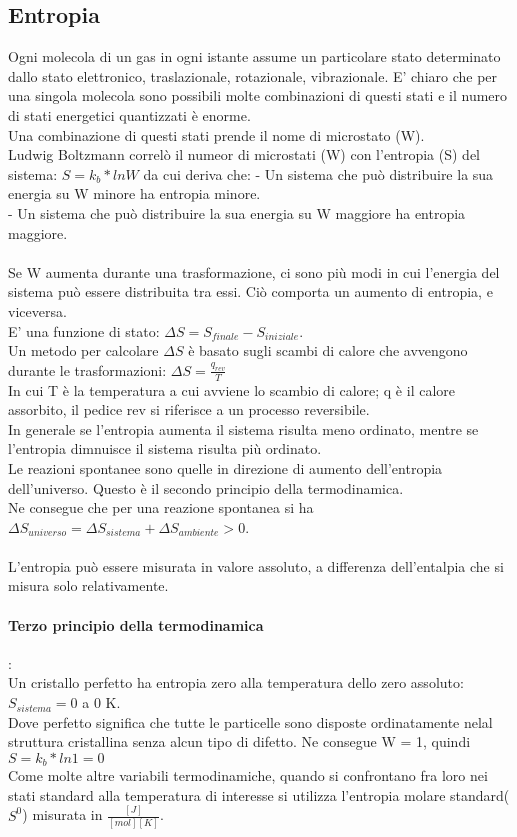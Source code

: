 \subsection{Entropia}
Ogni molecola di un gas in ogni istante assume un particolare stato determinato dallo stato elettronico, traslazionale, rotazionale, vibrazionale. E' chiaro che per una singola molecola sono possibili molte combinazioni di questi stati e il numero di stati energetici quantizzati è enorme.\\
Una combinazione di questi stati prende il nome di microstato (W).\\
Ludwig Boltzmann correlò il numeor di microstati (W) con l'entropia (S) del sistema: $S = k_b * lnW$ da cui deriva che:
\tab- Un sistema che può distribuire la sua energia su W minore ha entropia minore.\\
\tab- Un sistema che può distribuire la sua energia su W maggiore ha entropia maggiore.\\\\
Se W aumenta durante una trasformazione, ci sono più modi in cui l'energia del sistema può essere distribuita tra essi. Ciò comporta un aumento di entropia, e viceversa.\\
E' una funzione di stato: $\Delta S = S_{finale} - S_{iniziale}$.\\
Un metodo per calcolare $\Delta S$ è basato sugli scambi di calore che avvengono durante le trasformazioni: $\Delta S = \frac{q_{rev}}{T}$\\
In cui T è la temperatura a cui avviene lo scambio di calore; q è il calore assorbito, il pedice rev si riferisce a un processo reversibile.\\
In generale se l'entropia aumenta il sistema risulta meno ordinato, mentre se l'entropia dimnuisce il sistema risulta più ordinato.\\
Le reazioni spontanee sono quelle in direzione di aumento dell'entropia dell'universo. Questo è il secondo principio della termodinamica.\\
Ne consegue che per una reazione spontanea si ha $\Delta S_{universo} = \Delta S_{sistema} + \Delta S_{ambiente} > 0$.\\\\
L'entropia può essere misurata in valore assoluto, a differenza dell'entalpia che si misura solo relativamente.\\
\paragraph*{Terzo principio della termodinamica} :\\
Un cristallo perfetto ha entropia zero alla temperatura dello zero assoluto: $S_{sistema} = 0$ a 0 K.\\
Dove perfetto significa che tutte le particelle sono disposte ordinatamente nelal struttura cristallina senza alcun tipo di difetto. Ne consegue W = 1, quindi $S = k_b * ln1 = 0$\\
Come molte altre variabili termodinamiche, quando si confrontano fra loro nei stati standard alla temperatura di interesse si utilizza l'entropia molare standard($S^0$) misurata in $\frac{[J]}{[mol][K]}$.\\
